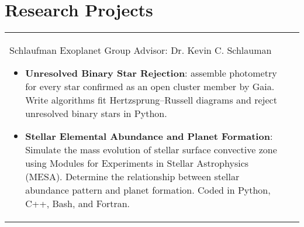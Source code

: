 \begin{paracol}{1}
\begin{supertabular}{L{4cm}@{\hskip 0.3in}L{13cm}}

  \end{supertabular}
  \vspace{-0.3cm}

  \section{Research Projects}





  \begin{supertabular}{L{4cm}@{\hskip 0.3in}L{13cm}} %

                 {Schlaufman Exoplanet Group} %
                 {Advisor: Dr. Kevin C. Schlauman} %
                 {\begin{itemize}
                     \vspace{-0.4cm}
                   \item \textbf{Unresolved Binary Star Rejection}:  assemble photometry for every star confirmed as an open cluster member by Gaia. Write algorithms fit Hertzsprung–Russell diagrams and reject unresolved binary stars in Python.
                   \item \textbf{Stellar Elemental Abundance and Planet Formation}: Simulate the mass evolution of stellar surface convective zone using Modules for Experiments in Stellar Astrophysics (MESA). Determine the relationship between stellar abundance pattern and planet formation. Coded in Python, C++, Bash, and Fortran.
                 \end{itemize}} %


\end{supertabular}
\end{paracol}
